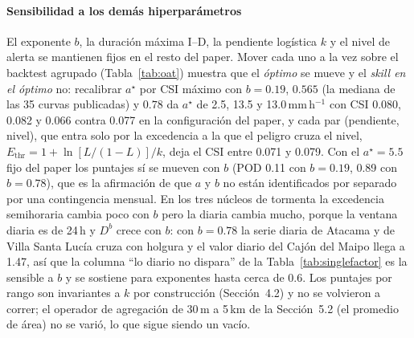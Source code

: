 \documentclass[authoryear,preprint,review,12pt]{elsarticle}
\begin{document}
\paragraph{Sensibilidad a los demás hiperparámetros}
El exponente $b$, la duración máxima I--D, la pendiente logística $k$ y el nivel de alerta se mantienen fijos en el resto del paper. Mover cada uno a la vez sobre el backtest agrupado (Tabla~\ref{tab:oat}) muestra que el \emph{óptimo} se mueve y el \emph{skill en el óptimo} no: recalibrar $a^\star$ por CSI máximo con $b=0.19$, $0.565$ (la mediana de las 35 curvas publicadas) y $0.78$ da $a^\star$ de 2.5, 13.5 y 13.0\,mm\,h$^{-1}$ con CSI 0.080, 0.082 y 0.066 contra 0.077 en la configuración del paper, y cada par (pendiente, nivel), que entra solo por la excedencia a la que el peligro cruza el nivel, $E_\mathrm{thr}=1+\ln[L/(1-L)]/k$, deja el CSI entre 0.071 y 0.079. Con el $a^\star=5.5$ fijo del paper los puntajes sí se mueven con $b$ (POD 0.11 con $b=0.19$, 0.89 con $b=0.78$), que es la afirmación de que $a$ y $b$ no están identificados por separado por una contingencia mensual. En los tres núcleos de tormenta la excedencia semihoraria cambia poco con $b$ pero la diaria cambia mucho, porque la ventana diaria es de 24\,h y $D^b$ crece con $b$: con $b=0.78$ la serie diaria de Atacama y de Villa Santa Lucía cruza con holgura y el valor diario del Cajón del Maipo llega a 1.47, así que la columna ``lo diario no dispara'' de la Tabla~\ref{tab:singlefactor} es la sensible a $b$ y se sostiene para exponentes hasta cerca de 0.6. Los puntajes por rango son invariantes a $k$ por construcción (Sección~4.2) y no se volvieron a correr; el operador de agregación de 30\,m a 5\,km de la Sección~5.2 (el promedio de área) no se varió, lo que sigue siendo un vacío.
\end{document}
